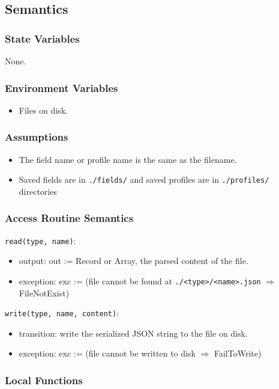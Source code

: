 \documentclass[12pt, titlepage]{article}
\begin{document}
\subsection{Semantics}

\subsubsection{State Variables}
None.

\subsubsection{Environment Variables}
\begin{itemize}
  \item Files on disk.
\end{itemize}

\subsubsection{Assumptions}
\begin{itemize}
  \item The field name or profile name is the same as the filename.
  \item Saved fields are in \texttt{./fields/} and saved profiles are in \texttt{./profiles/} directories
\end{itemize}


\subsubsection{Access Routine Semantics}

\noindent \texttt{read(type, name)}:
\begin{itemize}
\item output: out := Record or Array, the parsed content of the file.
\item exception: exc := (file cannot be found at \texttt{./<type>/<name>.json} $\Rightarrow$ FileNotExist)
\end{itemize}

\noindent \texttt{write(type, name, content)}:
\begin{itemize}
\item transition: write the serialized JSON string to the file on disk.
\item exception: exc := (file cannot be written to disk $\Rightarrow$ FailToWrite)
\end{itemize}

\subsubsection{Local Functions}
\end{document}
